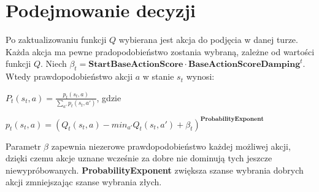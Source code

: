 \section{Podejmowanie decyzji}
Po zaktualizowaniu funkcji $Q$ wybierana jest akcja do podjęcia w danej turze. Każda akcja ma pewne pradopodobieństwo zostania wybraną, zależne od wartości funkcji $Q$. Niech $\beta_{t} = \textbf{StartBaseActionScore} \cdot \textbf{BaseActionScoreDamping}^{t}$. Wtedy prawdopodobieństwo akcji $a$ w stanie $s_{t}$ wynosi:

$P_{t}(s_{t},a) = \frac{p_{t}(s_{t},a)}{\sum_{a'}p_{t}(s_{t},a')}$, gdzie

$p_{t}(s_{t},a) = (Q_{t}(s_{t},a) - min_{a'}Q_{t}(s_{t},a') + \beta_{t})^{\textbf{ProbabilityExponent}}$

Parametr $\beta$ zapewnia niezerowe prawdopodobieństwo każdej możliwej akcji, dzięki czemu akcje uznane wcześnie za dobre nie dominują tych jeszcze niewypróbowanych. \textbf{ProbabilityExponent} zwiększa szanse wybrania dobrych akcji zmniejszając szanse wybrania złych.